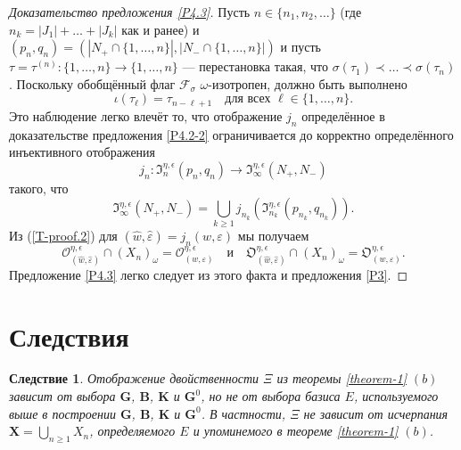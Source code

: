 \documentclass{amsart}
\newtheorem{corollary}{Следствие}
\theoremstyle{definition}
\newcommand{\bs}[1]{\boldsymbol{#1}}
\begin{document}
\begin{proof}[Доказательство предложения \ref{P4.3}]
Пусть $n\in\{n_1,n_2,\ldots\}$ (где $n_k=|J_1|+\ldots+|J_k|$ как и ранее) и $(p_n,q_n)=(|N_+\cap\{1,\ldots,n\}|,|N_-\cap\{1,\ldots,n\}|)$
и пусть $\tau=\tau^{(n)}:\{1,\ldots,n\}\to\{1,\ldots,n\}$
--- перестановка такая, что $\sigma(\tau_1)\prec\ldots\prec\sigma(\tau_n)$.
Поскольку обобщённый флаг $\mathcal{F}_\sigma$  $\omega$-изотропен,
должно быть выполнено
\[\iota(\tau_\ell)=\tau_{n-\ell+1}\quad\mbox{для всех $\ell\in\{1,\ldots,n\}$}.\]
Это наблюдение легко влечёт то, что отображение $j_n$ определённое в доказательстве
предложения \ref{P4.2-2}
ограничивается до корректно определённого инъективного отображения
\[j_n:\mathfrak{I}^{\eta,\epsilon}_n(p_n,q_n)\to \mathfrak{I}^{\eta,\epsilon}_\infty(N_+,N_-)\]
такого, что
\[\mathfrak{I}^{\eta,\epsilon}_\infty(N_+,N_-)=\bigcup_{k\geq 1}
j_{n_k}(\mathfrak{I}^{\eta,\epsilon}_{n_k}(p_{n_k},q_{n_k})).\]
Из (\ref{T-proof.2}) для $(\hat{w},\hat{\varepsilon})=j_n(w,\varepsilon)$ мы получаем
\begin{equation}
\label{T-proof.3}
\bs{\mathcal{O}}^{\eta,\epsilon}_{(\hat{w},\hat{\varepsilon})}\cap (X_{n})_\omega=\mathcal{O}^{\eta,\epsilon}_{(w,\varepsilon)}
\quad
\mbox{и}
\quad
\bs{\mathfrak{O}}^{\eta,\epsilon}_{(\hat{w},\hat{\varepsilon})}\cap (X_{n})_\omega=\mathfrak{O}^{\eta,\epsilon}_{(w,\varepsilon)}.
\end{equation}
Предложение \ref{P4.3} легко следует из этого факта и предложения \ref{P3}.
\end{proof}



\section{Следствия}

\label{S5}

\begin{corollary}
	Отображение двойственности $\Xi$ из теоремы \ref{theorem-1} $(b)$ зависит от выбора $\mathbf{G}$, $\mathbf{B}$, $\mathbf{K}$ и $\mathbf{G}^0$, но не от выбора базиса $E$, используемого выше в построении $\mathbf{G}$, $\mathbf{B}$, $\mathbf{K}$ и $\mathbf{G}^0$. В частности, $\Xi$ не зависит от исчерпания $\mathbf{X}= \bigcup_{n \geq 1} X_n$, определяемого $E$ и упоминемого в теореме \ref{theorem-1} $(b)$.
\end{corollary}
\end{document}
